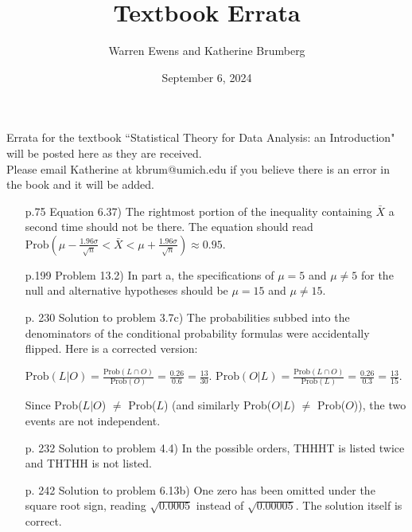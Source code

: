 \documentclass{article}
\title{Textbook Errata}
\author{Warren Ewens and Katherine Brumberg}
\date{September 6, 2024}
\begin{document}
\maketitle

\noindent Errata for the textbook ``Statistical Theory for Data Analysis: an Introduction" will be posted here as they are received. \\

\noindent Please email Katherine at kbrum@umich.edu if you believe there is an error in the book and it will be added.


\begin{enumerate}

\item[p.75] Equation 6.37) The rightmost portion of the inequality containing $\bar{X}$ a second time should not be there. The equation should read $\text{Prob}(\mu - \frac{1.96\sigma}{\sqrt{n}} < \bar{X} < \mu + \frac{1.96\sigma}{\sqrt{n}}) \approx 0.95$.

\item[p.199] Problem 13.2) In part a, the specifications of $\mu = 5$ and $\mu \neq 5$ for the null and alternative hypotheses should be $\mu = 15$ and $\mu \neq 15$.

\item[p. 230]  Solution to problem 3.7c) The probabilities subbed into the denominators of the conditional probability formulas were accidentally flipped. Here is a corrected version:

$\text{Prob}(L | O) = \frac{\text{Prob}(L\cap O)}{\text{Prob}(O)} = \frac{0.26}{0.6} = \frac{13}{30}.$
$\text{Prob}(O | L) = \frac{\text{Prob}(L\cap O)}{\text{Prob}(L)} = \frac{0.26}{0.3} =  \frac{13}{15}.$\smallskip

Since Prob($L | O$) $\neq$ Prob($L$) (and similarly Prob($O | L$) $\neq$ Prob($O$)), the two events are not independent.

\item[p. 232] Solution to problem 4.4) In the possible orders, THHHT is listed twice and THTHH is not listed.

\item[p. 242] Solution to problem 6.13b) One zero has been omitted under the square root sign, reading $\sqrt{0.0005}$ instead of $\sqrt{0.00005}$. The solution itself is correct.

\end{enumerate}
\end{document}

